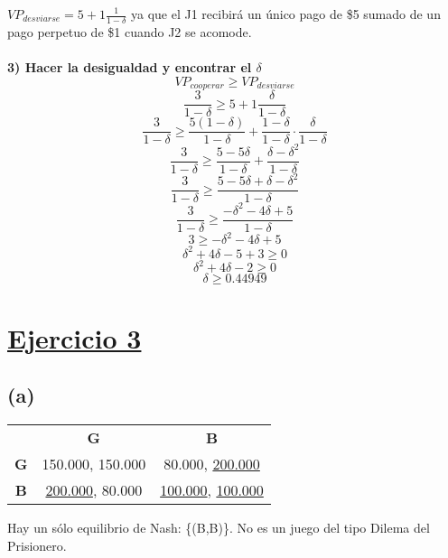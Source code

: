 \documentclass{article}
\newcommand{\ulcolor}[2][Red]{\setulcolor{#1}\ul{#2}}
\begin{document}
            \(VP_{desviarse} = 5 + 1 \frac{1}{1 - \delta}\) ya que el J1 recibirá un único pago de \$5 sumado de un pago perpetuo de \$1 cuando J2 se acomode.
            \\
            \\
            \textbf{3) Hacer la desigualdad y encontrar el $\delta$}
            \\
            \[VP_{cooperar} \geq VP_{desviarse}\]
            \[\frac{3}{1 - \delta} \geq 5 + 1 \frac{\delta}{1 - \delta}\]
            \[\frac{3}{1 - \delta} \geq \frac{5(1 - \delta)}{1 - \delta} + \frac{1 - \delta}{1 - \delta} \cdot \frac{\delta}{1 - \delta}\]
            \[\frac{3}{1 - \delta} \geq \frac{5 - 5 \delta}{1 - \delta} + \frac{\delta - \delta^{2}}{1 - \delta}\]
            \[\frac{3}{1 - \delta} \geq \frac{5 - 5 \delta + \delta - \delta^{2}}{1 - \delta}\]
            \[\frac{3}{1 - \delta} \geq \frac{- \delta^{2} - 4 \delta + 5}{1 - \delta}\]
            \[3 \geq - \delta^{2} - 4 \delta + 5\]
            \[\delta^{2} + 4 \delta - 5 + 3 \geq 0\]
            \[\delta^{2} + 4 \delta - 2 \geq 0\]
            \[\delta \geq 0.44949\]

    \section{}
     
    \section*{\underline{Ejercicio 3}}
        \subsection*{(a)}
            \begin{table}[h]
                \centering
                \begin{tabular}{ccc}
                    & \textbf{G} & \textbf{B}\\
                    \textbf{G} & 150.000, 150.000 & 80.000, \ulcolor[Blue]{200.000}\\
                    \textbf{B} & \ulcolor[Red]{200.000}, 80.000 & \ulcolor[Red]{100.000}, \ulcolor[Blue]{100.000}\\
                \end{tabular}
            \end{table}
            Hay un sólo equilibrio de Nash: \{(B,B)\}. No es un juego del tipo Dilema del Prisionero.
        
\end{document}
